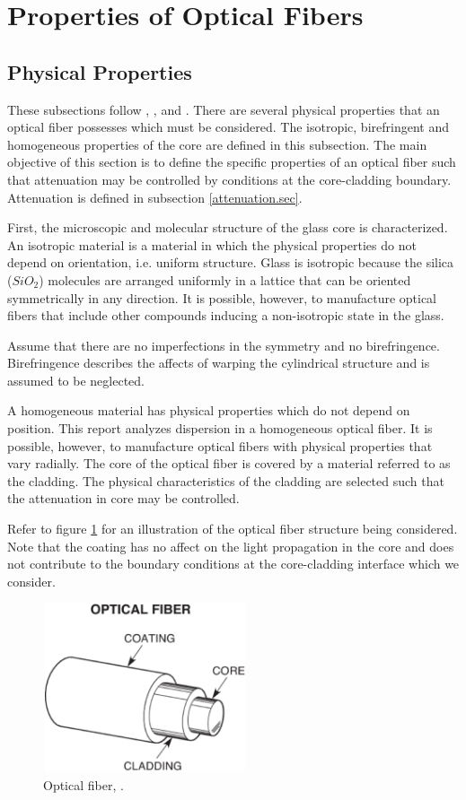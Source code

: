 \documentclass[12pt]{article}
\theoremstyle{definition}
\numberwithin{equation}{section}
\begin{document}
\section{Properties of Optical Fibers}\label{properties.sec}
\subsection{Physical Properties}
These subsections follow \cite{Belanger}, \cite{Okamoto}, \cite{Reitz} and \cite{Partha}. There are several physical properties that an optical fiber possesses which must be considered. The isotropic, birefringent and homogeneous properties of the core are defined in this subsection. The main objective of this section is to define the specific properties of an optical fiber such that attenuation may be controlled by conditions at the core-cladding boundary. Attenuation is defined in subsection \ref{attenuation.sec}.

First, the microscopic and molecular structure of the glass core is characterized. An isotropic material is a material in which the physical properties do not depend on orientation, i.e. uniform structure. Glass is isotropic because the silica ($SiO_2$) molecules are arranged uniformly in a lattice that can be oriented symmetrically in any direction. It is possible, however, to manufacture optical fibers that include other compounds inducing a non-isotropic state in the glass.

Assume that there are no imperfections in the symmetry and no birefringence. Birefringence describes the affects of warping the cylindrical structure and is assumed to be neglected.

A homogeneous material has physical properties which do not depend on position. This report analyzes dispersion in a homogeneous optical fiber. It is possible, however, to manufacture optical fibers with physical properties that vary radially. The core of the optical fiber is covered by a material referred to as the cladding. The physical characteristics of the cladding are selected such that the attenuation in core may be controlled.

Refer to figure \ref{figure1} for an illustration of the optical fiber structure being considered. Note that the coating has no affect on the light propagation in the core and does not contribute to the boundary conditions at the core-cladding interface which we consider.
\begin{figure}[h!]
	\centerline{\includegraphics[height = 50mm, width=60mm, angle=0]{optical_fiber.eps}}
\caption{Optical fiber, \cite{fig_1}.}
\label{figure1}
\end{figure}
\end{document}
